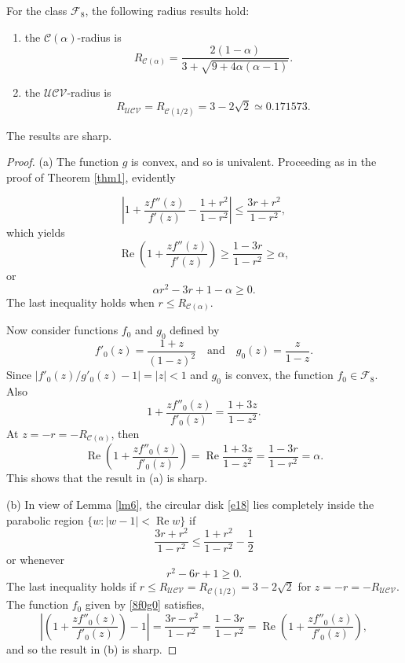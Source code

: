 \documentclass{amsart}
\begin{document}
\begin{theorem}\label{thm3}
For the class $\mathcal{F}_8$,    the following radius results hold:
\begin{enumerate}
\item[(a)]\label{i23}the ${\mathcal{C}(\alpha)}$-radius  is
\[R_{\mathcal{C}(\alpha)}=\frac{2(1-\alpha)}{3+\sqrt{9+4\alpha(\alpha-1)}}.\]
\item[(b)]\label{i24} the ${\mathcal{UCV}}$-radius  is
\[R_{\mathcal{UCV}}= R_{\mathcal{C}( 1/2)}=3-2\sqrt{2}\simeq0.171573 .\]
\end{enumerate}
 The results are sharp.
\end{theorem}
\begin{proof}
(a) The function $g$ is convex, and so is univalent. Proceeding as in the proof of Theorem \ref{thm1}, evidently

\begin{equation}\label{e18}
\left|1+\frac{zf''(z)}{f'(z)} -\frac{1+r^2}{1-r^2}\right|\leq\frac{3r+r^2}{1-r^2},
\end{equation}
which yields
\[\operatorname{Re}\left(1+\frac{zf''(z)}{f'(z)}\right) \geq\frac{1-3r}{1-r^2}\geq\alpha,\]
 or \[\alpha r^2-3r+1-\alpha \geq0.\]
 The last inequality holds when  $r\leq R_{\mathcal{C}(\alpha)}$.

Now consider functions $f_0$ and $g_0$ defined by
\begin{equation}\label{8f0g0}
f'_0(z)=\frac{1+z}{(1-z)^2} \quad \text{and} \quad g_0(z)= \frac{z}{1-z}.
\end{equation}
Since $\left| f'_0(z)/g'_0(z)-1\right|=|z|<1$  and $g_0$ is convex,  the function
$f_0 \in \mathcal{F}_8$. Also
\[1+\frac{zf''_0(z)}{f'_0(z)}=\frac{1+3z }{1-z^2}.\]
  At  $z=-r=-R_{\mathcal{C}(\alpha)}$, then
\[\operatorname{Re}\left(1+\frac{zf''_0(z)}{f'_0(z)}\right)=\operatorname{Re}\frac{1+3z}{1-z^2}=\frac{1-3r}{1-r^2}=\alpha.\]
This shows that  the result in (a)  is sharp.

(b) In view of Lemma \ref{lm6}, the  circular disk \eqref{e18}  lies completely  inside the parabolic region $\{w:|w-1|<\operatorname{Re} w\}$ if
\[\frac{3r+r^2}{1-r^2}\leq\frac{1+r^2}{1-r^2}-\frac{1}{2}\]
or whenever
\begin{equation}\label{eq6}
r^2-6r+1\geq0.
\end{equation} The last inequality holds if $r\leq R_{\mathcal{UCV}}=R_{\mathcal{C}( 1/2)}=3-2\sqrt{2}$ for $z=-r=-R_{\mathcal{UCV}}$.
The function $f_0 $ given  by \eqref{8f0g0} satisfies,
\[
\left|\left(1+\frac{zf''_0(z)}{f'_0(z)}\right)-1\right| =\frac{3r-r^2}{1-r^2} =\frac{1-3r}{1-r^2}
 =\operatorname{Re}\left(1+\frac{zf''_0(z)}{f'_0(z)}\right),
\]
 and so the result in (b)  is sharp.
\end{proof}
\end{document}
